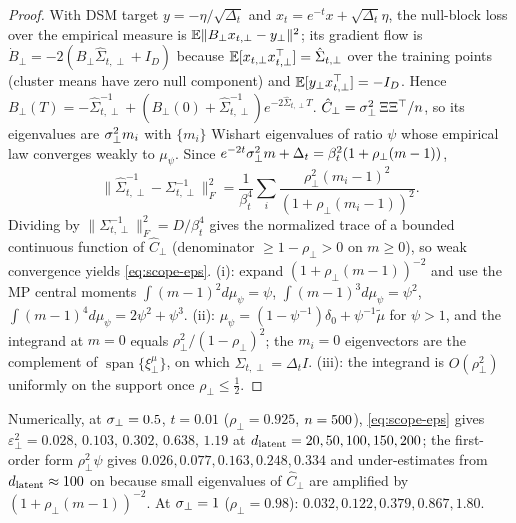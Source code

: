 \begin{proof}
With DSM target $y=-\eta/\sqrt{\Delta_t}$ and $x_t=e^{-t}x+\sqrt{\Delta_t}\eta$, the null-block loss over the empirical measure is $\mathbb{E}\|B_\perp x_{t,\perp}-y_\perp\|^2$; its gradient flow is $\dot B_\perp=-2(B_\perp\hat\Sigma_{t,\perp}+I_D)$ because $\mathbb{E}[x_{t,\perp}x_{t,\perp}^\top]=\hat\Sigma_{t,\perp}$ over the training points (cluster means have zero null component) and $\mathbb{E}[y_\perp x_{t,\perp}^\top]=-I_D$. Hence $B_\perp(T)=-\hat\Sigma_{t,\perp}^{-1}+(B_\perp(0)+\hat\Sigma_{t,\perp}^{-1})e^{-2\hat\Sigma_{t,\perp}T}$. $\hat C_\perp=\sigma_{\perp}^2\,\Xi\Xi^\top/n$, so its eigenvalues are $\sigma_{\perp}^2m_i$ with $\{m_i\}$ Wishart eigenvalues of ratio $\psi$ whose empirical law converges weakly to $\mu_\psi$. Since $e^{-2t}\sigma_{\perp}^2m+\Delta_t=\beta_t^2(1+\rho_\perp(m-1))$,
$$\|\hat\Sigma_{t,\perp}^{-1}-\Sigma_{t,\perp}^{-1}\|_F^2=\frac1{\beta_t^4}\sum_i\frac{\rho_\perp^2(m_i-1)^2}{(1+\rho_\perp(m_i-1))^2}.$$
Dividing by $\|\Sigma_{t,\perp}^{-1}\|_F^2=D/\beta_t^4$ gives the normalized trace of a bounded continuous function of $\hat C_\perp$ (denominator $\ge1-\rho_\perp>0$ on $m\ge0$), so weak convergence yields \eqref{eq:scope-eps}. (i): expand $(1+\rho_\perp(m-1))^{-2}$ and use the MP central moments $\int(m-1)^2d\mu_\psi=\psi$, $\int(m-1)^3d\mu_\psi=\psi^2$, $\int(m-1)^4d\mu_\psi=2\psi^2+\psi^3$. (ii): $\mu_\psi=(1-\psi^{-1})\delta_0+\psi^{-1}\tilde\mu$ for $\psi>1$, and the integrand at $m=0$ equals $\rho_\perp^2/(1-\rho_\perp)^2$; the $m_i=0$ eigenvectors are the complement of $\operatorname{span}\{\xi^\mu_\perp\}$, on which $\hat\Sigma_{t,\perp}=\Delta_tI$. (iii): the integrand is $O(\rho_\perp^2)$ uniformly on the support once $\rho_\perp\le\tfrac12$.
\end{proof}
Numerically, at $\sigma_{\perp}=0.5$, $t=0.01$ ($\rho_\perp=0.925$, $n=500$), \eqref{eq:scope-eps} gives $\varepsilon_\perp^2=0.028,\,0.103,\,0.302,\,0.638,\,1.19$ at $d_{\mathrm{latent}}=20,50,100,150,200$; the first-order form $\rho_\perp^2\psi$ gives $0.026,0.077,0.163,0.248,0.334$ and under-estimates from $d_{\mathrm{latent}}\approx100$ on because small eigenvalues of $\hat C_\perp$ are amplified by $(1+\rho_\perp(m-1))^{-2}$. At $\sigma_{\perp}=1$ ($\rho_\perp=0.98$): $0.032,0.122,0.379,0.867,1.80$.

